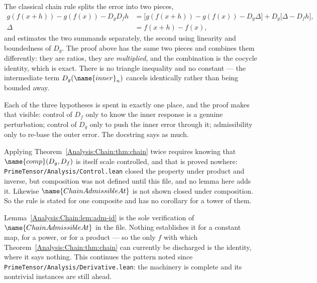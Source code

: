 \begin{designnote}
\label{Analysis:Chain:note:telescope}
The classical chain rule splits the error into two pieces,
\begin{align*}
  g(f(x+h)) - g(f(x)) - D_g D_f h
  &= \bigl[g(f(x+h)) - g(f(x)) - D_g \Delta\bigr]
   + D_g\bigl[\Delta - D_f h\bigr], \\
  \Delta &= f(x+h) - f(x),
\end{align*}
and estimates the two summands separately, the second using linearity and
boundedness of $D_g$.  The proof above has the same two pieces and combines
them differently: they are ratios, they are \emph{multiplied}, and the
combination is the cocycle identity, which is exact.  There is no triangle
inequality and no constant --- the intermediate term $D_g(\name{inner}_n)$
cancels identically rather than being bounded away.

Each of the three hypotheses is spent in exactly one place, and the proof makes
that visible: control of $D_f$ only to know the inner response is a genuine
perturbation; control of $D_g$ only to push the inner error through it;
admissibility only to re-base the outer error.  The docstring says as much.
\end{designnote}

\begin{remark}
\label{Analysis:Chain:rem:no-iterate}
Applying Theorem~\ref{Analysis:Chain:thm:chain} twice requires knowing that
$\name{comp}(D_g,D_f)$ is itself scale controlled, and that is proved nowhere:
\texttt{PrimeTensor/Analysis/Control.lean} closed the property under product
and inverse, but composition was not defined until this file, and no lemma here
adds it.  Likewise $\name{ChainAdmissibleAt}$ is not shown closed under
composition.  So the rule is stated for one composite and has no corollary for
a tower of them.
\end{remark}

\begin{remark}
\label{Analysis:Chain:rem:only-identity}
Lemma~\ref{Analysis:Chain:lem:adm-id} is the sole verification of
$\name{ChainAdmissibleAt}$ in the file.  Nothing establishes it for a constant
map, for a power, or for a product --- so the only $f$ with which
Theorem~\ref{Analysis:Chain:thm:chain} can currently be discharged is the
identity, where it says nothing.  This continues the pattern noted since
\texttt{PrimeTensor/Analysis/Derivative.lean}: the machinery is complete and
its nontrivial instances are still ahead.
\end{remark}

